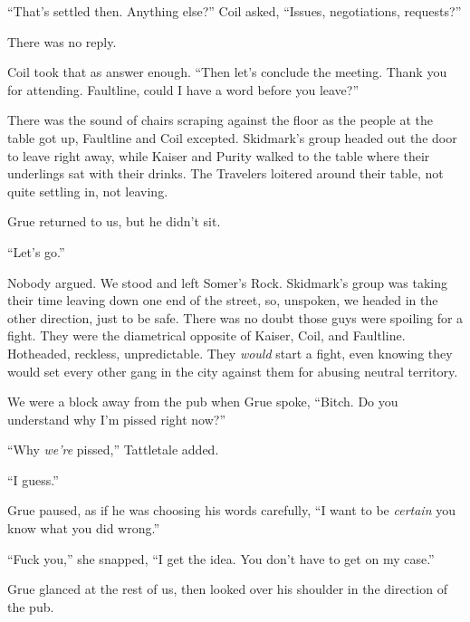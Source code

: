 ``That's settled then.  Anything else?'' Coil asked, ``Issues, negotiations, requests?''



There was no reply.



Coil took that as answer enough.  ``Then let's conclude the meeting.  Thank you for attending.  Faultline, could I have a word before you leave?''



There was the sound of chairs scraping against the floor as the people at the table got up, Faultline and Coil excepted.  Skidmark's group headed out the door to leave right away, while Kaiser and Purity walked to the table where their underlings sat with their drinks.  The Travelers loitered around their table, not quite settling in, not leaving.



Grue returned to us, but he didn't sit.



``Let's go.''



Nobody argued.  We stood and left Somer's Rock.  Skidmark's group was taking their time leaving down one end of the street, so, unspoken, we headed in the other direction, just to be safe.  There was no doubt those guys were spoiling for a fight.  They were the diametrical opposite of Kaiser, Coil, and Faultline.  Hotheaded, reckless, unpredictable.  They \emph{would }start a fight, even knowing they would set every other gang in the city against them for abusing neutral territory.



We were a block away from the pub when Grue spoke, ``Bitch.  Do you understand why I'm pissed right now?''



``Why \emph{we're} pissed,'' Tattletale added.



``I guess.''



Grue paused, as if he was choosing his words carefully, ``I want to be \emph{certain} you know what you did wrong.''



``Fuck you,'' she snapped, ``I get the idea.  You don't have to get on my case.''



Grue glanced at the rest of us, then looked over his shoulder in the direction of the pub.



